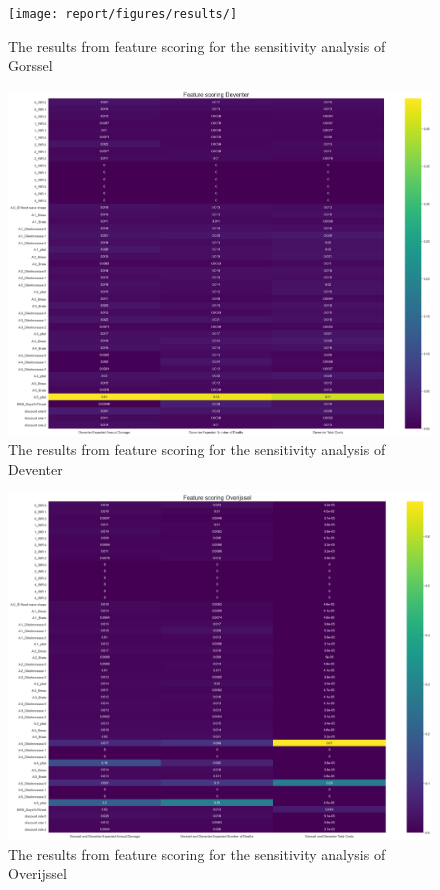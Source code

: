 \begin{figure}[h!]
    \centering
    \texttt{[image: report/figures/results/]}
    \caption{The results from feature scoring for the sensitivity analysis of Gorssel}
    \label{fig:feat-scor-g}
\end{figure}

\begin{figure}[h!]
    \centering
    \includegraphics[width=\textwidth]{report/figures/results/Feature_scoring_Deventer_100scen.png}
    \caption{The results from feature scoring for the sensitivity analysis of Deventer}
    \label{fig:feat-scor-d}
\end{figure}

\begin{figure}[h!]
    \centering
    \includegraphics[width=\textwidth]{report/figures/results/Feature_scoring_Overijssel_100scen.png}
    \caption{The results from feature scoring for the sensitivity analysis of Overijssel}
    \label{fig:feat-scor-o}
\end{figure}